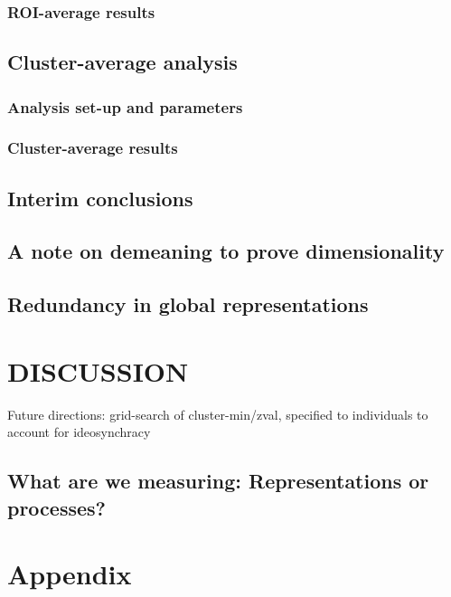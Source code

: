 \documentclass[jou,12pt,a4paper]{apa6}
\begin{document}
\subsubsection{ROI-average results}

\subsection{Cluster-average analysis}

\subsubsection{Analysis set-up and parameters}

\subsubsection{Cluster-average results}

\subsection{Interim conclusions}

\subsection{A note on demeaning to prove dimensionality}

\subsection{Redundancy in global representations}




\section{DISCUSSION}

Future directions:
grid-search of cluster-min/zval, specified to individuals to account for ideosynchracy

\subsection{What are we measuring: Representations or processes?}




\newpage
\onecolumn
\vspace*{1px}
\section{\Huge \textnormal{Appendix}}
\vspace{25px}
\end{document}
